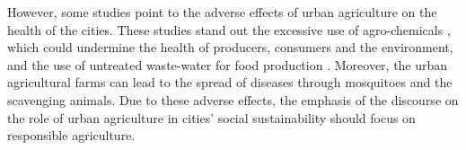 However, some studies point to the adverse effects of urban agriculture on the health of the cities. These studies stand out the excessive use of agro-chemicals \cite{Veenhuizen, Amoah2007, Agbenyour2014}, which could undermine the health of producers, consumers and the environment, and the use of untreated waste-water for food production \cite{Amponsah2015, Veenhuizen, Becerra-Castro2015, Amponsah2015, Mara2010, Ndunda}. Moreover, the urban agricultural farms can lead to the spread of diseases through mosquitoes and the scavenging animals. Due to these adverse effects, the emphasis of the discourse on the role of urban agriculture in cities' social sustainability should focus on responsible agriculture.

%
%
%
%
%

